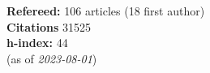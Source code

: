 \textbf{Refereed:} 106 articles (18 first author)\\\textbf{Citations} 31525\\\textbf{h-index:} 44\\(as of \textit{2023-08-01})